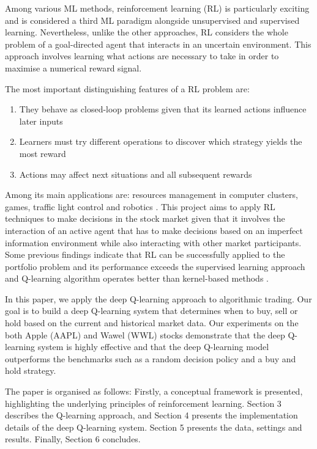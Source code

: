 \documentclass[12pt, authoryear]{elsarticle}
\begin{document}
Among various ML methods, reinforcement learning (RL) is particularly exciting and is considered a third ML paradigm alongside unsupervised and supervised learning. Nevertheless, unlike the other approaches, RL considers the whole problem of a goal-directed agent that interacts in an uncertain environment. This approach involves learning what actions are necessary to take in order to maximise a numerical reward signal. 

The most important distinguishing features of a RL problem are:
\begin{enumerate}
	\item They behave as closed-loop problems given that its learned actions influence later inputs
	\item Learners must try different operations to discover which strategy yields the most reward
	\item Actions may affect next situations and all subsequent rewards \citep{sutton1998introduction}
\end{enumerate}

Among its main applications are: resources management in computer clusters, games, traffic light control and robotics \cite{mnih2013playing}. This project aims to apply RL techniques to make decisions in the stock market given that it involves the interaction of an active agent that has to make decisions based on an imperfect information environment while also interacting with other market participants. Some previous findings indicate that RL can be successfully applied to the portfolio problem and its performance exceeds the supervised learning approach \citep{neuneier1996optimal} and Q-learning algorithm operates better than kernel-based methods \citep{bertoluzzo2012testing}.

In this paper, we apply the deep Q-learning approach to algorithmic trading. Our goal is to build a deep Q-learning system that determines when to buy, sell or hold based on the current and historical market data. Our experiments on
the both Apple (AAPL) and Wawel (WWL) stocks demonstrate that the deep Q-learning system is highly effective and that the deep Q-learning model outperforms the benchmarks such as a random decision policy and a buy and hold strategy.

The paper is organised as follows: Firstly, a conceptual framework is presented, highlighting the underlying principles of reinforcement learning. Section 3 describes the Q-learning approach, and Section 4 presents the implementation details of the deep Q-learning system. Section 5 presents the data, settings and results. Finally, Section 6 concludes.
\end{document}
